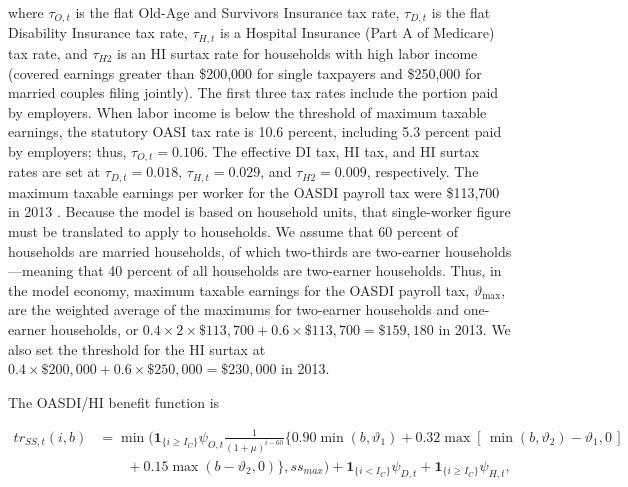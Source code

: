 \documentclass[11pt,leqno,fleqn]{article}
\begin{document}
where $\tau_{O,t}$ is the flat Old-Age and Survivors Insurance tax rate, $\tau_{D,t}$ is the flat Disability Insurance tax rate, $\tau_{H,t}$ is a Hospital Insurance (Part A of Medicare) tax rate, and $\tau_{H2}$ is an HI surtax rate for households with high labor income (covered earnings greater than \$200,000 for single taxpayers and \$250,000 for married couples filing jointly). The first three tax rates include the portion paid by employers. When labor income is below the threshold of maximum taxable earnings, the statutory OASI tax rate is 10.6 percent, including 5.3 percent paid by employers; thus, $\tau_{O,t}=0.106$. The effective DI tax, HI tax, and HI surtax rates are set at $\tau_{D,t}=0.018$, $\tau_{H,t}=0.029$, and $\tau_{H2}=0.009$, respectively. The maximum taxable earnings per worker for the OASDI payroll tax were \$113,700 in 2013 \citep{SSA:2014}. Because the model is based on household units, that single-worker figure must be translated to apply to households. We assume that 60 percent of households are married households, of which two-thirds are two-earner households---meaning that 40 percent of all households are two-earner households. Thus, in the model economy, maximum taxable earnings for the OASDI payroll tax, $\vartheta_{\max}$, are the weighted average of the maximums for two-earner households and one-earner households, or $0.4\times2\times\$113{,}700+0.6\times\$113{,}700=\$159{,}180$ in 2013. We also set the threshold for the HI surtax at $0.4\times\$200{,}000+0.6\times\$250{,}000=\$230{,}000$ in 2013.

The OASDI/HI benefit function is

\begin{align*}
tr_{SS,t}(i,b)&=\min\Big(\mathbf{1}_{\{i\geq I_{C}\}}\psi_{O,t}\frac{1}{(1+\mu)^{i-60}}
\bigl\{0.90\min(b,\vartheta_{1})
+0.32\max\left[\,\min(b,\vartheta_{2})-\vartheta_{1},0\,\right]\\
&\qquad+0.15\max(b-\vartheta_{2},0)\bigr\},ss_{max}\Big)
+\mathbf{1}_{\{i<I_{C}\}}\psi_{D,t}+\mathbf{1}_{\{i\geq I_{C}\}}\psi_{H,t},
\end{align*}
\end{document}
